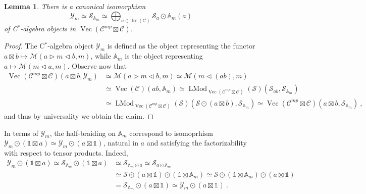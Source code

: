 \documentclass[a4paper,11pt,reqno]{amsart}
\numberwithin{equation}{section}
\newtheorem{lemma}[theorem]{Lemma}
\theoremstyle{remark}
\theoremstyle{definition}
\newcommand{\bA}{\mathbb A}
\newcommand{\cC}{\mathcal C}
\newcommand{\cM}{\mathcal M}
\newcommand{\cS}{\mathcal S}
\newcommand{\cY}{\mathcal Y}
\DeclareMathOperator{\Irr}{Irr}
\DeclareMathOperator{\Vect}{Vec}
\DeclareMathOperator{\LMod}{LMod}
\newcommand\un{{\mathds 1}}
\begin{document}
\begin{lemma}
	There is a canonical isomorphism 
	\[
	\cY_m \simeq \cS_{\bA_m} \simeq \bigoplus_{a \in \Irr(\cC)} \cS_a \odot \bA_m(a)
	\]
	of C$^*$-algebra objects in $\Vect(\cC^{mp} \boxtimes \cC)$.
\end{lemma}

\begin{proof}
	The C$^*$-algebra object $\cY_m$ is defined as the object representing the functor $a \boxtimes b \mapsto \cM(a \triangleright m \triangleleft b,m)$, while $\bA_m$ is the object representing $a \mapsto \cM(m \triangleleft a,m)$. Observe now that
	\begin{align*}
		\Vect(\cC^{mp} \boxtimes \cC)(a \boxtimes b, \cY_m) & \simeq \cM(a \triangleright m \triangleleft b, m)  \simeq \cM(m \triangleleft (ab),m) \\
		& \simeq \Vect(\cC)(ab, \bA_m) \simeq \LMod_{\Vect(\cC^{mp} \boxtimes \cC)}(\cS)(\cS_{ab},\cS_{\bA_m}) \\
		& \simeq \LMod_{\Vect(\cC^{mp} \boxtimes \cC)}(\cS)(\cS \odot (a \boxtimes b),\cS_{\bA_m}) \simeq \Vect(\cC^{mp} \boxtimes \cC)(a \boxtimes b, \cS_{\bA_m}) \ ,
	\end{align*}
	and thus by universality we obtain the claim.
\end{proof}

In terms of $\cY_m$, the half-braiding on $\bA_m$ correspond to isomoprhism $\cY_m \odot (\un \boxtimes a) \simeq \cY_m \odot (a \boxtimes \un)$, natural in $a$ and satisfying the factorizability with respect to tensor products. Indeed,
\begin{align*}
	\cY_m \odot (\un \boxtimes a) \simeq \cS_{\bA_m} \odot (\un \boxtimes a) &\simeq \cS_{\bA_m \odot a} \simeq \cS_{a \odot \bA_m }\\
	& \simeq \cS \odot (a \boxtimes \un) \odot (\un \boxtimes \bA_m) \simeq \cS \odot (\un \boxtimes \bA_m) \odot (a \boxtimes \un) \\
	& = \cS_{\bA_m} \odot (a \boxtimes \un) \simeq \cY_m \odot (a \boxtimes \un) \ .
\end{align*}
\end{document}
